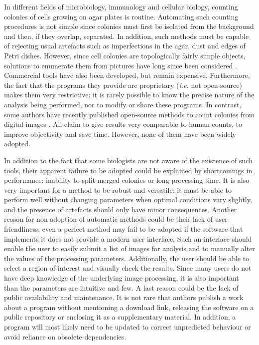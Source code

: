 \documentclass[10pt]{article}
\begin{document}
In different fields of microbiology, immunology and cellular biology, counting
colonies of cells growing on agar plates is routine.
Automating such counting procedures is not simple since colonies must first be isolated
from the background and then, if they overlap, separated. In addition, such methods must be capable of rejecting usual artefacts
such as imperfections in the agar, dust and edges of Petri dishes.
However, since cell colonies are topologically fairly simple objects, solutions to
enumerate them from pictures have long since been considered
\cite{mansberg_automatic_1957,mukherjee_bacterial_1995}. Commercial tools have
also been developed\cite{putman_simplified_2005}, but remain expensive.
Furthermore, the fact that the programs they provide are proprietary 
(\emph{i.e.} not open-source) makes them very restrictive: it is rarely possible
to know the precise nature of the analysis being performed, nor to modify or
share these programs.
In contrast, some authors have recently published open-source methods to count
colonies from digital
images\cite{cai_optimized_2011,bewes_automated_2008,niyazi_counting_2007,clarke_lowcost_2010,sieuwerts_simple_2008,vokes_using_2008,brugger_automated_2012}
. All claim to give results very comparable to human counts, to improve
objectivity and save time. However, none of them have been widely adopted. 


In addition to the fact that some biologists are not aware of the existence of such
tools, their apparent failure to be adopted could be explained by shortcomings
in performance: inability to split merged colonies
or long processing time. It is also very important for a method to be robust and versatile:
it must be able to perform well without changing parameters when optimal conditions vary slightly,
and the presence of artefacts should only have minor consequences.
Another reason for non-adoption of automatic methods could be their lack of
user-friendliness; even a perfect method may fail to be adopted if the software
that implements it does not provide a modern user interface. Such an interface
should enable the user to easily submit a list of images for analysis and to
manually alter the values of the processing parameters. Additionally, the user
should be able to select a region of interest and visually check the results.
Since many users do not have deep knowledge of the underlying image processing, 
it is also important than the parameters are intuitive and few.
A last reason could be the lack of public availability
and maintenance. It is not rare that authors publish a work about a
program without mentioning a download link, releasing the software on a public
repository or enclosing it as a supplementary
material\cite{bewes_automated_2008,kachouie_arraycount_2009}.
In addition, a program will most likely need to be updated to correct
unpredicted behaviour or avoid reliance on obsolete dependencies.
\end{document}
